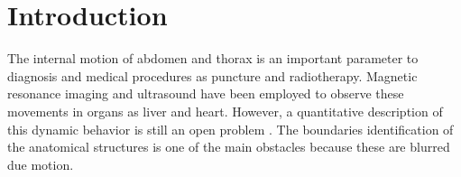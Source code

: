 \documentclass[10pt,a4paper,report]{article}
\begin{document}
\section{Introduction}


The internal motion of abdomen and thorax is an important parameter to diagnosis and medical procedures as puncture and radiotherapy. Magnetic resonance imaging and ultrasound have been employed to observe these movements in organs as liver and heart. However, a quantitative description of this dynamic behavior is still an open problem \cite{Wu2016, DeLuca2013, Martinez2011}. The boundaries identification of the anatomical structures is one of the main obstacles because these are blurred due motion.




\end{document}
